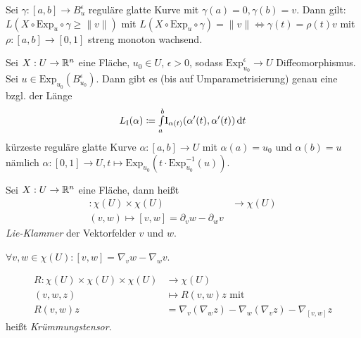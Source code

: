 \documentclass{cheat-sheet}
\newcommand{\I}{\mathrm{I}}
\newcommand{\Exp}{\mathrm{Exp}} %
\let\mySum\sum
\DeclareMathOperator*{\textsum}{{\textstyle \mySum}}
\renewcommand{\sum}{\textsum\limits}
\begin{document}
\begin{satz}
  Sei $\gamma : [a, b] \to B_u^\epsilon$ reguläre glatte Kurve mit $\gamma(a) = 0, \gamma(b) = v$. Dann gilt: $L(X \circ \Exp_u \circ \gamma \geq \|v\|)$ mit $L(X \circ \Exp_u \circ \gamma) = \|v\| \iff \gamma(t) = \rho(t)v$ mit $\rho : [a, b] \to [0, 1]$ streng monoton wachsend.
\end{satz}

\begin{satz}
  Sei $X : U \to \mathbb{R}^n$ eine Fläche, $u_0 \in U$, $\epsilon > 0$, sodass $\Exp_{u_0}^{\epsilon} \to U$ Diffeomorphismus. Sei $u \in \Exp_{u_0}(B_{u_0}^{\epsilon})$. Dann gibt es (bis auf Umparametrisierung) genau eine bzgl. der Länge
  \[ L_\I(\alpha) \coloneqq \Int{a}{b}{\I_{\alpha(t)}(\alpha'(t), \alpha'(t))}{t} \]
  kürzeste reguläre glatte Kurve $\alpha : [a, b] \to U$ mit $\alpha(a) = u_0$ und $\alpha(b) = u$ nämlich $\alpha : [0, 1] \to U, t \mapsto \Exp_{u_0}(t \cdot \Exp_{u_0}^{-1}(u))$.
\end{satz}



\begin{defn}
  Sei $X : U \to \mathbb{R}^n$ eine Fläche, dann heißt
  \begin{align*}
    [\cdot,\cdot] : \chi(U) \times \chi(U) &\to \chi(U)\\
    (v, w) \mapsto [v, w] = \partial_v w - \partial_w v
  \end{align*}
  \emph{Lie-Klammer} der Vektorfelder $v$ und $w$.
\end{defn}

\begin{satz}
  $\forall v, w \in \chi(U) : [v, w] = \nabla_v w - \nabla_w v$.
\end{satz}


\begin{defn}
  \begin{align*}
    R : \chi(U) \times \chi(U) \times \chi(U) &\to \chi(U)\\
    (v, w, z) &\mapsto R(v, w) z \text{ mit }\\
    R(v, w) z &= \nabla_v (\nabla_w z) - \nabla_w (\nabla_v z) - \nabla_{[v, w]} z
  \end{align*}
  heißt \emph{Krümmungstensor}.
\end{defn}
\end{document}
